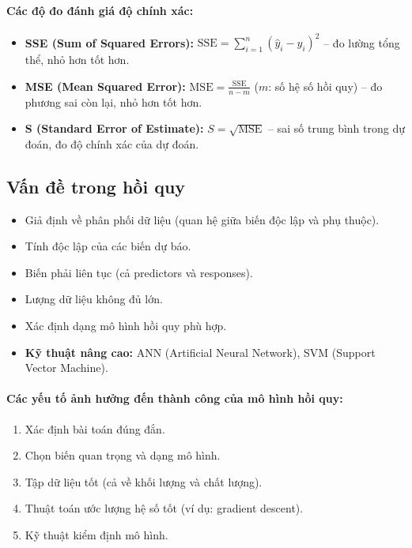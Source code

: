 \documentclass[10pt]{article}
\begin{document}
\paragraph{Các độ đo đánh giá độ chính xác:}
\begin{itemize}
    \item \textbf{SSE (Sum of Squared Errors):} $\text{SSE} = \sum_{i=1}^{n}(\hat{y}_i - y_i)^2$ -- đo lường tổng thể, nhỏ hơn tốt hơn.
    \item \textbf{MSE (Mean Squared Error):} $\text{MSE} = \frac{\text{SSE}}{n-m}$ ($m$: số hệ số hồi quy) -- đo phương sai còn lại, nhỏ hơn tốt hơn.
    \item \textbf{S (Standard Error of Estimate):} $S = \sqrt{\text{MSE}}$ -- sai số trung bình trong dự đoán, đo độ chính xác của dự đoán.
\end{itemize}

\subsection{Vấn đề trong hồi quy}

\begin{itemize}
    \item Giả định về phân phối dữ liệu (quan hệ giữa biến độc lập và phụ thuộc).
    \item Tính độc lập của các biến dự báo.
    \item Biến phải liên tục (cả predictors và responses).
    \item Lượng dữ liệu không đủ lớn.
    \item Xác định dạng mô hình hồi quy phù hợp.
    \item \textbf{Kỹ thuật nâng cao:} ANN (Artificial Neural Network), SVM (Support Vector Machine).
\end{itemize}

\paragraph{Các yếu tố ảnh hưởng đến thành công của mô hình hồi quy:}
\begin{enumerate}
    \item Xác định bài toán đúng đắn.
    \item Chọn biến quan trọng và dạng mô hình.
    \item Tập dữ liệu tốt (cả về khối lượng và chất lượng).
    \item Thuật toán ước lượng hệ số tốt (ví dụ: gradient descent).
    \item Kỹ thuật kiểm định mô hình.
\end{enumerate}
\end{document}
